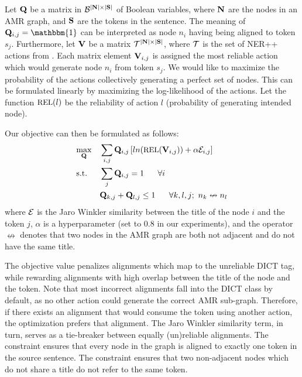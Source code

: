 Let $\mathbf{Q}$ be a matrix in $\mathcal{B}^{|\mathbf{N}| \times |\mathbf{S}|}$ of Boolean variables,
  where $\mathbf{N}$ are the 
  nodes in an AMR graph, and $\mathbf{S}$ are the tokens in the sentence.
The meaning of $\bQ_{i,j} = \mathbbm{1}$ can be interpreted as node 
  $n_i$ having being aligned to token $s_j$.
Furthermore, let $\mathbf{V}$ be a matrix $\mathcal{T}^{|\mathbf{N}| \times |\mathbf{S}|}$, where
  $\mathcal{T}$ is the set of NER++ actions from .
Each matrix element $\mathbf{V}_{i,j}$ is assigned the most reliable action which would
  generate node $n_i$ from token $s_j$.
We would like to maximize the probability of the actions collectively generating a perfect set of nodes.
This can be formulated linearly by maximizing the log-likelihood of the actions.
Let the function $\textrm{\small{REL}}(l)$ be the reliability of action $l$ (probability of generating intended node).

Our objective can then be formulated as follows:
\begin{align}
  \label{eqn:objective}
  & \underset{\bQ}{\textrm{max}}
     & & \sum_{i,j} \bQ_{i,j} \left[ 
         ln(\textrm{\small{REL}}(\bV_{i,j}))
         + \alpha \sE_{i,j} \right] \\
  \label{eqn:constraint1}
  & \textrm{s.t.}
     & & \sum_{j} \bQ_{i,j} = 1 ~~~~~ \forall i \\
  \label{eqn:constraint2}
  & & & \bQ_{k,j} + \bQ_{l,j} \leq 1 ~~~~~ \forall k,l,j; ~ n_k \nleftrightarrow n_l
\end{align}
where $\mathcal{E}$ is the Jaro Winkler similarity between the title of the node $i$ and the
  token $j$, $\alpha$ is a hyperparameter (set to 0.8 in our experiments),
  and the operator $\nleftrightarrow$ denotes that two nodes in the AMR graph are
  both not adjacent and do not have the same title.

The objective value penalizes alignments which map to the unreliable DICT tag,
  while rewarding alignments with high overlap between the title of the node and
  the token.
Note that most incorrect alignments fall into the DICT class by default, as no other
  action could generate the correct AMR sub-graph.
Therefore, if there exists an alignment that would consume the token using another
  action, the optimization prefers that alignment.
The Jaro Winkler similarity term, in turn, serves as a tie-breaker between equally
  (un)reliable alignments.
The constraint  ensures that every node in the graph is
  aligned to exactly one token in the source sentence.
The constraint  ensures that two non-adjacent nodes which do
  not share a title do not refer to the same token.

